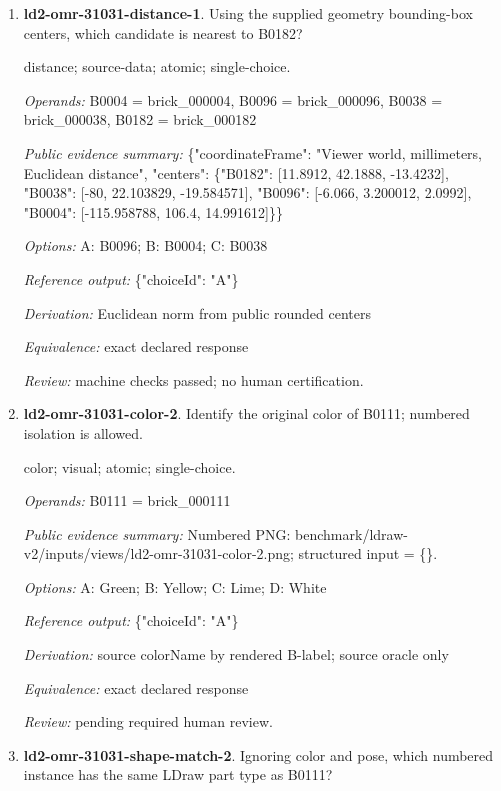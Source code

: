 \begin{enumerate}
\item \textbf{ld2-omr-31031-distance-1}. Using the supplied geometry bounding-box centers, which candidate is nearest to B0182?
\par{\small distance; source-data; atomic; single-choice.\par\textit{Operands:} B0004 = brick\_000004, B0096 = brick\_000096, B0038 = brick\_000038, B0182 = brick\_000182\par\textit{Public evidence summary:} \{"coordinateFrame": "Viewer world, millimeters, Euclidean distance", "centers": \{"B0182": [11.8912, 42.1888, -13.4232], "B0038": [-80, 22.103829, -19.584571], "B0096": [-6.066, 3.200012, 2.0992], "B0004": [-115.958788, 106.4, 14.991612]\}\}\par\textit{Options:} A: B0096; B: B0004; C: B0038\par\textit{Reference output:} \{"choiceId": "A"\}\par\textit{Derivation:} Euclidean norm from public rounded centers\par\textit{Equivalence:} exact declared response\par\textit{Review:} machine checks passed; no human certification.}
\item \textbf{ld2-omr-31031-color-2}. Identify the original color of B0111; numbered isolation is allowed.
\par{\small color; visual; atomic; single-choice.\par\textit{Operands:} B0111 = brick\_000111\par\textit{Public evidence summary:} Numbered PNG: benchmark/ldraw-v2/inputs/views/ld2-omr-31031-color-2.png; structured input = \{\}.\par\textit{Options:} A: Green; B: Yellow; C: Lime; D: White\par\textit{Reference output:} \{"choiceId": "A"\}\par\textit{Derivation:} source colorName by rendered B-label; source oracle only\par\textit{Equivalence:} exact declared response\par\textit{Review:} pending required human review.}
\item \textbf{ld2-omr-31031-shape-match-2}. Ignoring color and pose, which numbered instance has the same LDraw part type as B0111?

\end{enumerate}
